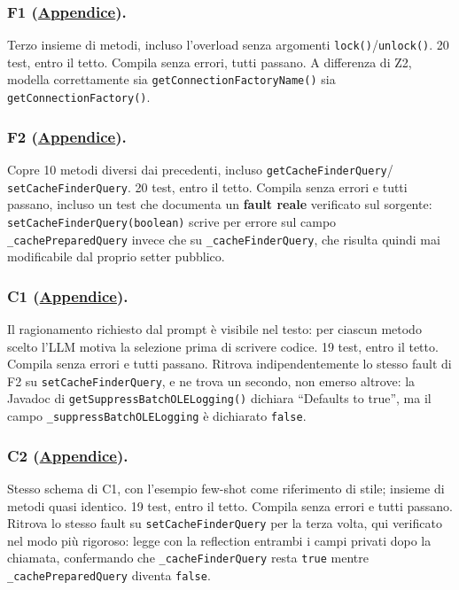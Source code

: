\subsubsection{F1 (\hyperref[prompt:f1]{Appendice}).}
Terzo insieme di metodi, incluso l'overload senza argomenti \texttt{lock()}/\texttt{unlock()}. 20 test, entro
il tetto. Compila senza errori, tutti passano. A differenza di Z2, modella
correttamente sia \texttt{getConnectionFactoryName()} sia \texttt{getConnectionFactory()}.

\subsubsection{F2 (\hyperref[prompt:f2]{Appendice}).}
Copre 10 metodi diversi dai precedenti, incluso \texttt{getCacheFinderQuery}/
\texttt{setCacheFinderQuery}. 20 test, entro il tetto. Compila senza errori e tutti
passano, incluso un test che documenta un \textbf{fault reale} verificato sul sorgente:
\texttt{setCacheFinderQuery(boolean)} scrive per errore sul campo \texttt{\_cachePreparedQuery}
invece che su \texttt{\_cacheFinderQuery}, che risulta quindi mai modificabile dal proprio setter
pubblico.

\subsubsection{C1 (\hyperref[prompt:c1]{Appendice}).}
Il ragionamento richiesto dal prompt è visibile nel testo: per ciascun metodo scelto l'LLM motiva
la selezione prima di scrivere codice. 19 test, entro il tetto. Compila senza errori e
tutti passano. Ritrova indipendentemente lo stesso fault di F2 su \texttt{setCacheFinderQuery}, e
ne trova un secondo, non emerso altrove: la Javadoc di \texttt{getSuppressBatchOLELogging()}
dichiara ``Defaults to true'', ma il campo \texttt{\_suppressBatchOLELogging} è dichiarato
\texttt{false}.

\subsubsection{C2 (\hyperref[prompt:c2]{Appendice}).}
Stesso schema di C1, con l'esempio few-shot come riferimento di stile; insieme di metodi quasi
identico. 19 test, entro il tetto. Compila senza errori e tutti passano. Ritrova lo
stesso fault su \texttt{setCacheFinderQuery} per la terza volta, qui
verificato nel modo più rigoroso: legge con la reflection entrambi i campi privati dopo la
chiamata, confermando che \texttt{\_cacheFinderQuery} resta \texttt{true} mentre
\texttt{\_cachePreparedQuery} diventa \texttt{false}.

